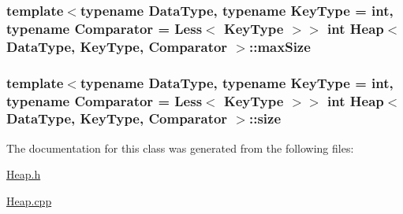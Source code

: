 \hypertarget{class_heap_a7f8e5c3cc64b8799b4e75b5a0f675e69}{
\subsubsection[{max\-Size}]{\setlength{\rightskip}{0pt plus 5cm}template$<$typename \-Data\-Type, typename \-Key\-Type = int, typename \-Comparator = \-Less$<$ Key\-Type $>$$>$ int {\bf \-Heap}$<$ \-Data\-Type, \-Key\-Type, \-Comparator $>$\-::{\bf max\-Size}}}\label{class_heap_a7f8e5c3cc64b8799b4e75b5a0f675e69}
\hypertarget{class_heap_a0964c2d309605bee2f6f1a9cee9ab89a}{
\subsubsection[{size}]{\setlength{\rightskip}{0pt plus 5cm}template$<$typename \-Data\-Type, typename \-Key\-Type = int, typename \-Comparator = \-Less$<$ Key\-Type $>$$>$ int {\bf \-Heap}$<$ \-Data\-Type, \-Key\-Type, \-Comparator $>$\-::{\bf size}}}\label{class_heap_a0964c2d309605bee2f6f1a9cee9ab89a}


\-The documentation for this class was generated from the following files\-:\begin{DoxyCompactItemize}
\item 
\hyperlink{_heap_8h}{\-Heap.\-h}\item 
\hyperlink{_heap_8cpp}{\-Heap.\-cpp}\end{DoxyCompactItemize}
